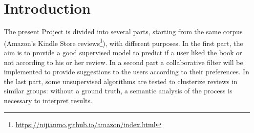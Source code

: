 \documentclass[fleqn,10pt]{SelfArx}
\begin{document}
\flushbottom %

\maketitle
\tableofcontents
\newpage

\thispagestyle{empty} %


\section*{Introduction}

The present Project is divided into several parts, starting from the same corpus (Amazon's Kindle Store reviews\footnote{\url{https://nijianmo.github.io/amazon/index.html}}), with different purposes.
In the first part, the aim is to provide a good supervised model to predict if a user liked the book or not according to his or her review.
In a second part a collaborative filter will be implemented to provide suggestions to the users according to their preferences.
In the last part, some unsupervised algorithms are tested to clusterize reviews in similar groups: without a ground truth, a semantic analysis of the process is necessary to interpret results.
\end{document}
